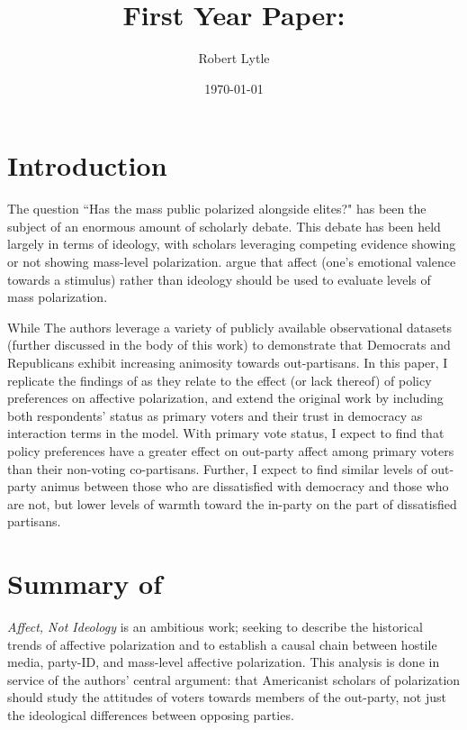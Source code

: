 \documentclass[12pt]{article}
\begin{document}
\title{First Year Paper:\\ \large{\citet{iyengar2012affect}}}
\author{Robert Lytle}
\date{\today}
\maketitle
\thispagestyle{empty}
\clearpage
\section{Introduction}
The question ``Has the mass public polarized alongside elites?" has been the subject of an enormous amount of scholarly debate. This debate has been held largely in terms of ideology, with scholars leveraging competing evidence showing \citep{abramowitz2010disappearing} or not showing \citep{fiorina2012disconnect} mass-level polarization. \cite{iyengar2012affect} argue that affect (one's emotional valence towards a stimulus) rather than ideology should be used to evaluate levels of mass polarization. 

While The authors leverage a variety of publicly available observational datasets (further discussed in the body of this work) to demonstrate that Democrats and Republicans exhibit increasing animosity towards out-partisans. In this paper, I replicate the findings of \cite{iyengar2012affect} as they relate to the effect (or lack thereof) of policy preferences on affective polarization, and extend the original work by including both respondents' status as primary voters and their trust in democracy as interaction terms in the model. With primary vote status, I expect to find that policy preferences have a greater effect on out-party affect among primary voters than their non-voting co-partisans. Further, I expect to find similar levels of out-party animus between those who are dissatisfied with democracy and those who are not, but lower levels of warmth toward the in-party on the part of dissatisfied partisans.


\section{Summary of \cite{iyengar2012affect}}
\textit{Affect, Not Ideology} is an ambitious work; seeking to describe the historical trends of affective polarization and to establish a causal chain between hostile media, party-ID, and mass-level affective polarization. This analysis is done in service of the authors' central argument: that Americanist scholars of polarization should study the attitudes of voters towards members of the out-party, not just the ideological differences between opposing parties.
\end{document}
